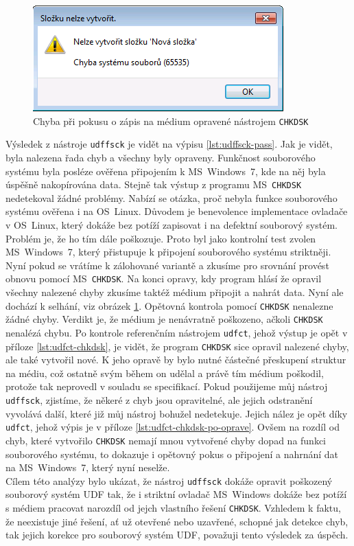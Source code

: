 \begin{figure}[b] 
    \centering
    \includegraphics[scale=0.42]{obrazky/win7-error.png}
    \caption{Chyba při pokusu o zápis na médium opravené nástrojem \texttt{CHKDSK}}
    \label{fig:win7-err}
\end{figure}
Výsledek z nástroje \texttt{udffsck} je vidět na výpisu \ref{lst:udffsck-pass}. Jak je vidět, byla nalezena řada chyb a všechny byly opraveny. Funkčnost souborového systému byla posléze ověřena připojením k MS~Windows~7, kde na něj byla úspěšně nakopírována data. Stejně tak výstup z programu MS~\texttt{CHKDSK} nedetekoval žádné problémy. Nabízí se otázka, proč nebyla funkce souborového systému ověřena i na OS~Linux. Důvodem je benevolence implementace ovladače v OS~Linux, který dokáže bez potíží zapisovat i na defektní souborový systém. Problém je, že ho tím dále poškozuje. Proto byl jako kontrolní test zvolen MS~Windows~7, který přistupuje k připojení souborového systému striktněji.\\
Nyní pokud se vrátíme k zálohované variantě a zkusíme pro srovnání provést obnovu pomocí MS~\texttt{CHKDSK}. Na konci opravy, kdy program hlásí že opravil všechny nalezené chyby zkusíme taktéž médium připojit a nahrát data. Nyní ale dochází k selhání, viz obrázek \ref{fig:win7-err}. Opětovná kontrola pomocí \texttt{CHKDSK} nenalezne žádné chyby. Verdikt je, že médium je nenávratně poškozeno, ačkoli \texttt{CHKDSK} nenalézá chybu. Po kontrole referenčním nástrojem \texttt{udfct}, jehož výstup je opět v příloze \ref{lst:udfct-chkdsk}, je vidět, že program \texttt{CHKDSK} sice opravil nalezené chyby, ale také vytvořil nové. K jeho opravě by bylo nutné částečné přeskupení struktur na médiu, což ostatně svým během on udělal a právě tím médium poškodil, protože tak neprovedl v souladu se specifikací. Pokud použijeme můj nástroj \texttt{udffsck}, zjistíme, že někeré z chyb jsou opravitelné, ale jejich odstranění vyvolává další, které již můj nástroj bohužel nedetekuje. Jejich nález je opět díky \texttt{udfct}, jehož výpis je v příloze \ref{lst:udfct-chkdsk-po-oprave}. Ovšem na rozdíl od chyb, které vytvořilo \texttt{CHKDSK} nemají mnou vytvořené chyby dopad na funkci souborového systému, to dokazuje i opětovný pokus o připojení a nahrnání dat na MS~Windows~7, který nyní neselže.\\
Cílem této analýzy bylo ukázat, že nástroj \texttt{udffsck} dokáže opravit poškozený souborový systém UDF tak, že i striktní ovladač MS~Windows dokáže bez potíží s médiem pracovat narozdíl od jejch vlastního řešení \texttt{CHKDSK}. Vzhledem k faktu, že neexistuje jiné řešení, ať už otevřené nebo uzavřené, schopné jak detekce chyb, tak jejich korekce pro souborový systém UDF, považuji tento výsledek za úspěch. 

